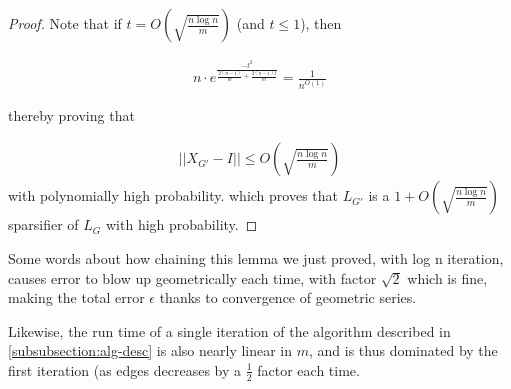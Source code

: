 \begin{proof}

      Note that if $t = O\left(\sqrt{\frac{n \log n}{m}}\right)$ (and $t \leq 1$), then 

      \begin{align}
      n \cdot e^{\frac{-t^2}{\frac{2(n-1)}{m} + \frac{2(n-1)t}{m}}}
      = \frac{1}{n^{O(1)}} 
      \end{align}


    thereby proving that 
      
      \begin{align}
      ||X_{G'} - I|| \leq O\left(\sqrt{\frac{n\log n}{m}}\right)
      \end{align}
        with polynomially high probability.
      which proves that $L_{G'}$ is a $1 + O\left(\sqrt{\frac{n\log n}{m}}\right)$
      sparsifier of $L_G$ with
      high probability.
    \end{proof}
    Some words about how chaining this lemma we just proved, with log n
    iteration, causes error to blow up geometrically each time, with factor
    $\sqrt{2}$ which is fine, 
    making the total error $\epsilon$ thanks to convergence of geometric series.

    Likewise, the run time of a single iteration of the algorithm described in
    \ref{subsubsection:alg-desc} is also nearly linear in $m$, and is thus
    dominated by the first iteration (as edges decreases by a $\frac{1}{2}$
    factor each time.



